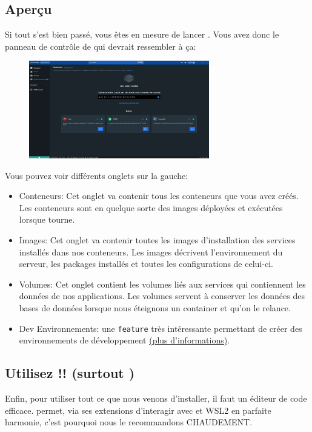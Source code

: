 \newpage

\subsection[Aperçu]{Aperçu\label{sec:suite_installation}}
    Si tout s'est bien passé, vous êtes en mesure de lancer \dockerdesktop{}. Vous avez donc le panneau de contrôle de \dockerdesktop{} qui devrait ressembler à ça:\\
    \begin{figure}[h]
        \centering
        \includegraphics[width=0.7\textwidth]{Images_formation/PanelDocker.pdf}
    \end{figure}

    Vous pouvez voir différents onglets sur la gauche:

    \begin{itemize}
        \item Conteneurs: Cet onglet va contenir tous les conteneurs que vous avez créés. Les conteneurs sont en quelque sorte des images déployées et exécutées lorsque \docker{} tourne.
        \item Images: Cet onglet va contenir toutes les images d'installation des services installés dans nos conteneurs. Les images décrivent l'environnement du serveur, les packages installés et toutes les configurations de celui-ci.
        \item Volumes: Cet onglet contient les volumes liés aux services qui contiennent les données de nos applications. Les volumes servent à conserver les données des bases de données lorsque nous éteignons un container et qu'on le relance.
        \item Dev Environnements: une \texttt{feature} très intéressante permettant de créer des environnements de développement \footnotesize{\href{https://docs.docker.com/desktop/dev-environments/}{(plus d'informations)}}.
    \end{itemize}

\subsection[VS Code]{Utilisez \vscode!! (surtout \windows)}
    Enfin, pour utiliser tout ce que nous venons d'installer, il faut un éditeur de code efficace. \href{https://code.visualstudio.com/}{\vscode{}} permet, via ses extensions d'interagir avec \docker{} et WSL2 en parfaite harmonie, c'est pourquoi nous le recommandons CHAUDEMENT. 

